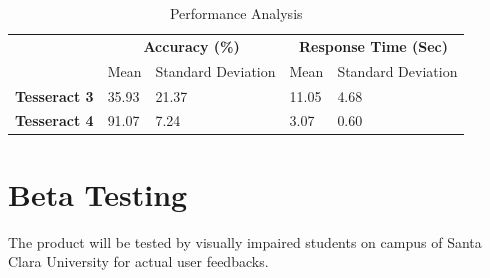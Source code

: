 		
\begin{table}[]
\centering
\caption{Performance Analysis}
\label{performanceAnalysis}
\begin{tabular}{l|l|l|l|l|}
\cline{2-5}
\multirow{2}{*}{}                          & \multicolumn{2}{c|}{\textbf{Accuracy (\%)}} & \multicolumn{2}{c|}{\textbf{Response Time (Sec)}} \\ \cline{2-5} 
                                           & Mean           & Standard Deviation         & Mean              & Standard Deviation            \\ \hline
\multicolumn{1}{|l|}{\textbf{Tesseract 3}} & 35.93          & 21.37                      & 11.05             & 4.68                          \\ \hline
\multicolumn{1}{|l|}{\textbf{Tesseract 4}} & 91.07          & 7.24                       & 3.07              & 0.60                          \\ \hline
\end{tabular}
\end{table}

	\section{Beta Testing}
	The product will be tested by visually impaired students on campus of Santa Clara University for actual user feedbacks.